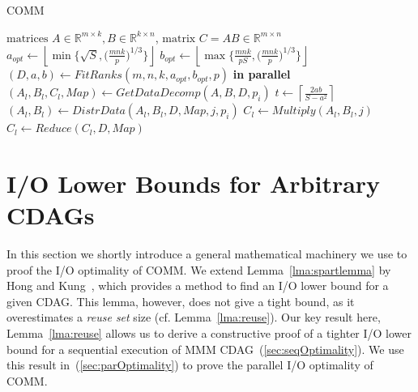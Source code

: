 \documentclass[sigplan,review,anonymous]{acmart}\settopmatter{printfolios=true,printccs=false,printacmref=false}
\begin{document}
\begin{algorithm}
	\small
\caption{COMM} \label{alg:comm}
\begin{algorithmic}[1]
\Require $\text{matrices } A \in \mathbb{R}^{m \times k}, B \in 
\mathbb{R}^{k \times n}$,
\Ensure $\text{matrix } C = AB \in \mathbb{R}^{m \times n}$
\State $a_{opt} \gets \left \lfloor \min\Big\{\sqrt{S}, 
\Big(\frac{mnk}{p}\Big)^{1/3} \Big\} \right \rfloor$ 
\label{alg:line:aopt}
\State $b_{opt} \gets \left \lfloor \max\Big\{\frac{mnk}{pS}, 
\Big(\frac{mnk}{p}\Big)^{1/3} \Big\} \right \rfloor$ 
\label{alg:line:bopt}
\State $(D, a, b) \gets FitRanks(m,n,k,a_{opt},b_{opt},p)$ 
\label{alg:line:fitranks}
 \textbf{in parallel}
\label{alg:line:outerloopStart}
%
\State $(A_l, B_l, C_l,Map) \gets GetDataDecomp(A,B, D, p_i)$ 
\label{alg:line:datadecomp}
\State $t \gets \left \lceil{\frac{2ab}{S - a^2}}\right \rceil$ 
\label{alg:line:steps}
\label{alg:line:innerloopStart}
\State $(A_l, B_l) \gets DistrData(A_l,B_l,D, Map, j, p_i)$ 
\label{alg:line:distrData}
\State $C_l \gets Multiply(A_l, B_l,j)$ 
\label{alg:line:compute}
\EndFor
\label{alg:line:innerLoopEnd}
\State $C_l \gets Reduce(C_l,D,  Map)$ 
\label{alg:line:reduce}
\EndFor
\label{alg:line:outerLoopEnd}
\end{algorithmic}
\end{algorithm}

\section{I/O Lower Bounds for Arbitrary CDAGs}
\label{sec:introIO}
In this section we shortly introduce a general mathematical machinery we use to 
proof 
the I/O optimality of COMM. We extend Lemma~\ref{lma:spartlemma} by 
Hong and 
Kung~\cite{redblue}, which provides a method to find an I/O lower bound for a 
given CDAG. This lemma, however, does not give a tight bound, as it 
overestimates a \emph{reuse set} size (cf. 
Lemma~\ref{lma:reuse}). Our key result here, Lemma~\ref{lma:reuse} 
allows us to derive a constructive proof of a tighter I/O lower bound for a 
sequential execution of MMM CDAG~(\cref{sec:seqOptimality}). We use this result 
in~(\cref{sec:parOptimality}) to prove the parallel I/O optimality of COMM.
\end{document}
